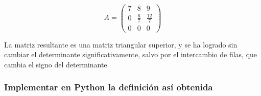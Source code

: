 \documentclass[11pt]{article}
\begin{document}
    \begin{equation}
A =
    \begin{pmatrix}
        7 & 8 & 9\\
        0 & \frac{6}{7} & \frac{12}{7}\\
        0 & 0 & 0
    \end{pmatrix}
\end{equation}

    La matriz resultante es una matriz triangular superior, y se ha logrado
sin cambiar el determinante significativamente, salvo por el intercambio
de filas, que cambia el signo del determinante.

    \subsubsection{Implementar en Python la definición así
obtenida}\label{implementar-en-python-la-definiciuxf3n-asuxed-obtenida}
\end{document}
